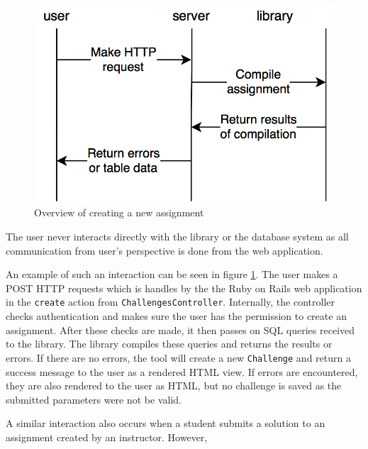 \begin{figure}[h]
    \centering
    \includegraphics[width=(\linewidth / 2)]{Chapters/4-Design/create_assignment.png}
    \caption{Overview of creating a new assignment}
    \label{fig:create_assignment}
\end{figure}

The user never interacts directly with the library or the database system as all communication from user's perspective is done from the web application.

An example of such an interaction can be seen in figure \ref{fig:create_assignment}. The user makes a POST HTTP requests which is handles by the the Ruby on Rails web application in the \texttt{create} action from \texttt{ChallengesController}. Internally, the controller checks authentication and makes sure the user has the permission to create an assignment. After these checks are made, it then passes on SQL queries received to the library. The library compiles these queries and returns the results or errors. If there are no errors, the tool will create a new \texttt{Challenge} and return a success message to the user as a rendered HTML view. If errors are encountered, they are also rendered to the user as HTML, but no challenge is saved as the submitted parameters were not be valid.

A similar interaction also occurs when a student submits a solution to an assignment created by an instructor. However,
